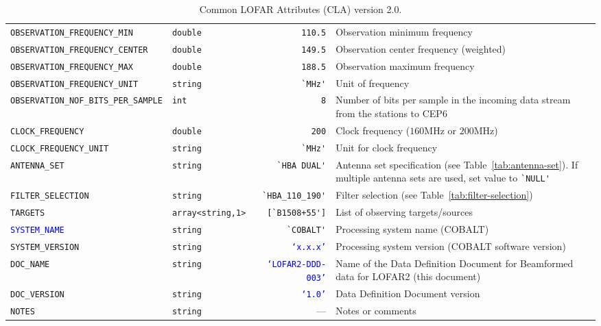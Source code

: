 \documentclass[a4paper,10pt,bibtotoc]{scrartcl}
\begin{document}
\begin{table}[htbp]
\begin{tabular}{|lp{1.5cm}rp{5cm}|}
    \small \verb|OBSERVATION_FREQUENCY_MIN| & \small\verb|double| & \verb|110.5|  &  Observation minimum frequency \\
    \small \verb|OBSERVATION_FREQUENCY_CENTER| & \small\verb|double| & \verb|149.5|  &  Observation center frequency (weighted) \\
    \small \verb|OBSERVATION_FREQUENCY_MAX| & \small\verb|double| & \verb|188.5|  &  Observation maximum frequency \\
    \small \verb|OBSERVATION_FREQUENCY_UNIT| & \small\verb|string| & \verb|`MHz'|  &  Unit of frequency \\
    \small \verb|OBSERVATION_NOF_BITS_PER_SAMPLE| & \small\verb|int| & \verb|8|  & Number of bits per sample in the incoming data stream from the stations to CEP6 \\
    \small \verb|CLOCK_FREQUENCY| & \small\verb|double| & \verb|200|  &  Clock frequency ($160 \mathrm{MHz}$ or $200 \mathrm{MHz}$) \\
    \small \verb|CLOCK_FREQUENCY_UNIT| & \small\verb|string| & \verb|`MHz'| &  Unit for clock frequency \\
    \small \verb|ANTENNA_SET| & \small\verb|string| & \verb|`HBA DUAL'|  &  Antenna set specification (see Table~\ref{tab:antenna-set}). If multiple antenna sets are used, set value to \verb|`NULL'| \\
    \small \verb|FILTER_SELECTION| & \small\verb|string| & \verb|`HBA_110_190'|  &  Filter selection (see Table~\ref{tab:filter-selection}) \\
    \small \verb|TARGETS| & \small\verb|array<string,1>| & \verb|[`B1508+55']|  &  List of observing targets/sources \\
    \small \textcolor{blue}{\texttt{SYSTEM\_NAME}} & \small\verb|string| & \verb|`COBALT'|  &  Processing system name (COBALT) \\
    \small \verb|SYSTEM_VERSION| & \small\verb|string| & \textcolor{blue}{\texttt{`x.x.x'}}  &  Processing system version (COBALT software version) \\
    \small \verb|DOC_NAME| & \small\verb|string|  & \textcolor{blue}{\texttt{`LOFAR2-DDD-003'}}  &  Name of the Data Definition Document for Beamformed data for LOFAR2 (this document) \\
    \small \verb|DOC_VERSION| & \small\verb|string|  & \textcolor{blue}{\texttt{`1.0'}}  &  Data Definition Document version \\
    \small \verb|NOTES| & \small\verb|string|  & ---  &  Notes or comments \\
   \hline
  \end{tabular}
  \caption{Common LOFAR Attributes (CLA) version 2.0.}
  \label{tab:lofar common metadata}
\end{table}
\end{document}
